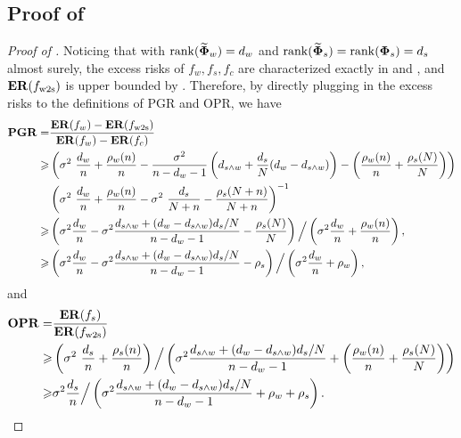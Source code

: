 \subsection{Proof of }\label{apx:pf_pgr}
\begin{proof}[Proof of ]
    Noticing that with $\mathop{\mathrm{rank}}(\widetilde{\boldsymbol{\Phi}}_w) = d_w$ and $\mathop{\mathrm{rank}}(\widetilde{\boldsymbol{\Phi}}_s) = \mathop{\mathrm{rank}}(\boldsymbol{\Phi}_s) = d_s$ almost surely, the excess risks of $f_w, f_s, f_c$ are characterized exactly in  and , and $\mathbf{ER}(f_{\mathrm{w2s}})$ is upper bounded by .
    Therefore, by directly plugging in the excess risks to the definitions of PGR and OPR, we have
    \begin{align}\label{eq:pgr_lower_tight}
    \begin{split}
        \mathbf{PGR} = &\frac{\mathbf{ER}(f_w) - \mathbf{ER}(f_{\mathrm{w2s}})}{\mathbf{ER}(f_w) - \mathbf{ER}(f_c)} \\
        \geqslant &\left(\sigma^2\ \frac{d_w}{n} + \frac{\rho_w(n)}{n} - \frac{\sigma^2}{n-d_w-1} \left(d_{s \wedge w} + \frac{d_s}{N} (d_w-d_{s \wedge w})\right) - \left(\frac{\rho_w(n)}{n} + \frac{\rho_s(N)}{N}\right)\right) \\
        &\left(\sigma^2\ \frac{d_w}{n} + \frac{\rho_w(n)}{n} - \sigma^2\ \frac{d_s}{N+n} - \frac{\rho_s(N+n)}{N+n}\right)^{-1} \\
        \geqslant &\left(\sigma^2 \frac{d_w}{n} - \sigma^2 \frac{d_{s \wedge w} + (d_w - d_{s \wedge w}) {d_s}/{N}}{n-d_w-1} - \frac{\rho_s(N)}{N}\right) \Big/ \left(\sigma^2 \frac{d_w}{n} + \frac{\rho_w(n)}{n}\right), \\
        \geqslant &\left(\sigma^2 \frac{d_w}{n} - \sigma^2 \frac{d_{s \wedge w} + (d_w - d_{s \wedge w}) {d_s}/{N}}{n-d_w-1} - \rho_s\right) \Big/ \left(\sigma^2 \frac{d_w}{n} + \rho_w\right),
    \end{split}
    \end{align}
    and 
    \begin{align}\label{eq:opr_lower_tight}
    \begin{split}
        \mathbf{OPR} = &\frac{\mathbf{ER}(f_s)}{\mathbf{ER}(f_{\mathrm{w2s}})} \\
        \geqslant &\left(\sigma^2\ \frac{d_s}{n} + \frac{\rho_s(n)}{n}\right) \Big/ \left(\sigma^2 \frac{d_{s \wedge w} + (d_w - d_{s \wedge w}) {d_s}/{N}}{n-d_w-1} + \left(\frac{\rho_w(n)}{n} + \frac{\rho_s(N)}{N}\right)\right) \\
        \geqslant &\sigma^2 \frac{d_s}{n} \Big/ \left(\sigma^2 \frac{d_{s \wedge w} + (d_w - d_{s \wedge w}) {d_s}/{N}}{n-d_w-1} + \rho_w + \rho_s\right).
    \end{split}
    \end{align} 


\end{proof}
